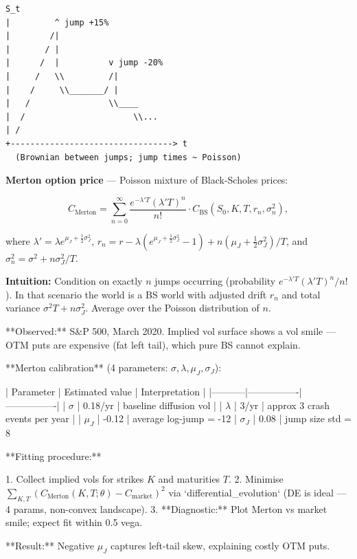 \documentclass[11pt,a4paper]{article}
\begin{document}
\begin{verbatim}
S_t
|         ^ jump +15%
|        /|
|       / |
|      /  |          v jump -20%
|     /   \\         /|
|    /     \\_______/ |
|   /                \\____
|  /                      \\...
| /
+---------------------------------> t
  (Brownian between jumps; jump times ~ Poisson)
\end{verbatim}

\textbf{Merton option price} --- Poisson mixture of Black-Scholes prices:

\[C_{\text{Merton}} = \sum_{n=0}^\infty \frac{e^{-\lambda' T}(\lambda' T)^n}{n!}
\cdot C_{\text{BS}}\!\left(S_0, K, T, r_n, \sigma_n^2\right),\]

where \(\lambda' = \lambda e^{\mu_J+\frac12\sigma_J^2}\), \(r_n = r - \lambda(e^{\mu_J+\frac12\sigma_J^2}-1) + n(\mu_J+\tfrac12\sigma_J^2)/T\), and \(\sigma_n^2 = \sigma^2 + n\sigma_J^2/T\).

\textbf{Intuition:} Condition on exactly \(n\) jumps occurring (probability \(e^{-\lambda' T}(\lambda' T)^n/n!\)). In that scenario the world is a BS world with adjusted drift \(r_n\) and total variance \(\sigma^2 T + n\sigma_J^2\). Average over the Poisson distribution of \(n\).

\begin{tcolorbox}[colback=notebg!60,colframe=optgreen,fonttitle=\bfseries\sffamily,title={\textsf{\textbf{Example}} — Example — Fitting Merton to a Crash Event},breakable]
**Observed:** S&P 500, March 2020.  Implied vol surface shows a vol smile —
OTM puts are expensive (fat left tail), which pure BS cannot explain.

**Merton calibration** (4 parameters: $\sigma, \lambda, \mu_J, \sigma_J$):

| Parameter | Estimated value | Interpretation |
|-----------|----------------|----------------|
| $\sigma$ | 0.18/yr | baseline diffusion vol |
| $\lambda$ | 3/yr | approx 3 crash events per year |
| $\mu_J$ | -0.12 | average log-jump = -12%
| $\sigma_J$ | 0.08 | jump size std = 8%

**Fitting procedure:**

1. Collect implied vols for strikes $K$ and maturities $T$.
2. Minimise $\sum_{K,T}(C_{\text{Merton}}(K,T;\theta) - C_{\text{market}})^2$
   via `differential_evolution` (DE is ideal — 4 params, non-convex landscape).
3. **Diagnostic:** Plot Merton vs market smile; expect fit within 0.5 vega.

**Result:** Negative $\mu_J$ captures left-tail skew, explaining costly OTM puts.
\end{tcolorbox}
\end{document}
